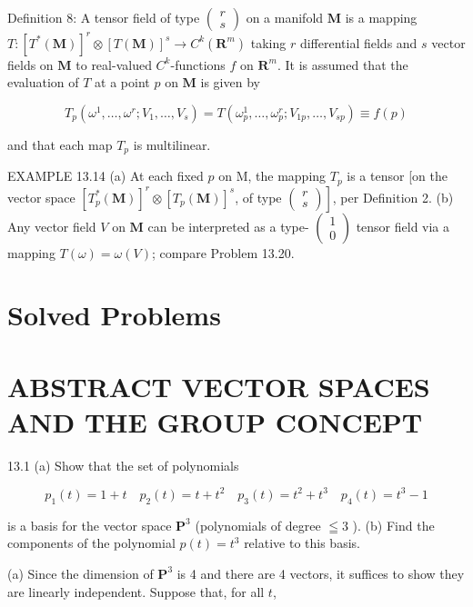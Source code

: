 \documentclass[10pt]{article}
\begin{document}
Definition 8: A tensor field of type $\left(\begin{array}{c}r \\ s\end{array}\right)$ on a manifold $\mathbf{M}$ is a mapping $T:\left[T^{*}(\mathbf{M})\right]^{r} \otimes[T(\mathbf{M})]^{s} \rightarrow C^{k}\left(\mathbf{R}^{m}\right)$ taking $r$ differential fields and $s$ vector fields on $\mathbf{M}$ to real-valued $C^{k}$-functions $f$ on $\mathbf{R}^{m}$. It is assumed that the evaluation of $T$ at a point $p$ on $\mathbf{M}$ is given by

$$
T_{p}\left(\omega^{1}, \ldots, \omega^{r} ; V_{1}, \ldots, V_{s}\right)=T\left(\omega_{p}^{1}, \ldots, \omega_{p}^{r} ; V_{1 p}, \ldots, V_{s p}\right) \equiv f(p)
$$

and that each map $T_{p}$ is multilinear.

EXAMPLE 13.14 (a) At each fixed $p$ on M, the mapping $T_{p}$ is a tensor [on the vector space $\left[T_{p}^{*}(\mathbf{M})\right]^{r} \otimes\left[T_{p}(\mathbf{M})\right]^{s}$, of type $\left.\left(\begin{array}{c}r \\ s\end{array}\right)\right]$, per Definition 2. (b) Any vector field $V$ on $\mathbf{M}$ can be interpreted as a type- $\left(\begin{array}{l}1 \\ 0\end{array}\right)$ tensor field via a mapping $T(\omega)=\omega(V)$; compare Problem 13.20.

\section*{Solved Problems}
\section*{ABSTRACT VECTOR SPACES AND THE GROUP CONCEPT}
13.1 (a) Show that the set of polynomials

$$
p_{1}(t)=1+t \quad p_{2}(t)=t+t^{2} \quad p_{3}(t)=t^{2}+t^{3} \quad p_{4}(t)=t^{3}-1
$$

is a basis for the vector space $\mathbf{P}^{3}$ (polynomials of degree $\leqq 3$ ). (b) Find the components of the polynomial $p(t)=t^{3}$ relative to this basis.

(a) Since the dimension of $\mathbf{P}^{3}$ is 4 and there are 4 vectors, it suffices to show they are linearly independent. Suppose that, for all $t$,
\end{document}
